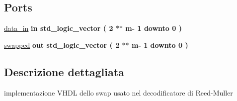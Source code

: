 \subsection*{Ports}
 \begin{DoxyCompactItemize}
\item 
\hypertarget{class_butterfly_cell_ga2b10c9545b143a051326b4159f5bb7e8}{\hyperlink{group___r_m_decoder_ga2b10c9545b143a051326b4159f5bb7e8}{data\+\_\+in}  {\bfseries {\bfseries \textcolor{vhdlchar}{in}\textcolor{vhdlchar}{ }}} {\bfseries \textcolor{vhdlchar}{std\+\_\+logic\+\_\+vector}\textcolor{vhdlchar}{ }\textcolor{vhdlchar}{(}\textcolor{vhdlchar}{ }\textcolor{vhdlchar}{ } \textcolor{vhdldigit}{2} \textcolor{vhdlchar}{$\ast$}\textcolor{vhdlchar}{$\ast$}\textcolor{vhdlchar}{ }\textcolor{vhdlchar}{ }\textcolor{vhdlchar}{ }\textcolor{vhdlchar}{m}\textcolor{vhdlchar}{-\/}\textcolor{vhdlchar}{ } \textcolor{vhdldigit}{1} \textcolor{vhdlchar}{ }\textcolor{vhdlchar}{downto}\textcolor{vhdlchar}{ }\textcolor{vhdlchar}{ } \textcolor{vhdldigit}{0} \textcolor{vhdlchar}{ }\textcolor{vhdlchar}{)}\textcolor{vhdlchar}{ }} }\label{class_butterfly_cell_ga2b10c9545b143a051326b4159f5bb7e8}

\item 
\hypertarget{class_butterfly_cell_gaa4bbca026b8d1cb018aae06d500d2f54}{\hyperlink{group___r_m_decoder_gaa4bbca026b8d1cb018aae06d500d2f54}{swapped}  {\bfseries {\bfseries \textcolor{vhdlchar}{out}\textcolor{vhdlchar}{ }}} {\bfseries \textcolor{vhdlchar}{std\+\_\+logic\+\_\+vector}\textcolor{vhdlchar}{ }\textcolor{vhdlchar}{(}\textcolor{vhdlchar}{ }\textcolor{vhdlchar}{ } \textcolor{vhdldigit}{2} \textcolor{vhdlchar}{$\ast$}\textcolor{vhdlchar}{$\ast$}\textcolor{vhdlchar}{ }\textcolor{vhdlchar}{ }\textcolor{vhdlchar}{ }\textcolor{vhdlchar}{m}\textcolor{vhdlchar}{-\/}\textcolor{vhdlchar}{ } \textcolor{vhdldigit}{1} \textcolor{vhdlchar}{ }\textcolor{vhdlchar}{downto}\textcolor{vhdlchar}{ }\textcolor{vhdlchar}{ } \textcolor{vhdldigit}{0} \textcolor{vhdlchar}{ }\textcolor{vhdlchar}{)}\textcolor{vhdlchar}{ }} }\label{class_butterfly_cell_gaa4bbca026b8d1cb018aae06d500d2f54}

\end{DoxyCompactItemize}


\subsection{Descrizione dettagliata}
implementazione V\+H\+D\+L dello swap usato nel decodificatore di Reed-\/\+Muller 

